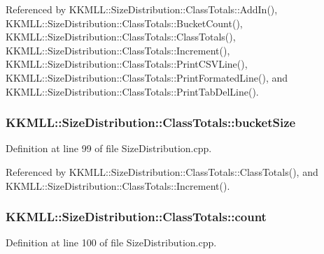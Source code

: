 Referenced by K\+K\+M\+L\+L\+::\+Size\+Distribution\+::\+Class\+Totals\+::\+Add\+In(), K\+K\+M\+L\+L\+::\+Size\+Distribution\+::\+Class\+Totals\+::\+Bucket\+Count(), K\+K\+M\+L\+L\+::\+Size\+Distribution\+::\+Class\+Totals\+::\+Class\+Totals(), K\+K\+M\+L\+L\+::\+Size\+Distribution\+::\+Class\+Totals\+::\+Increment(), K\+K\+M\+L\+L\+::\+Size\+Distribution\+::\+Class\+Totals\+::\+Print\+C\+S\+V\+Line(), K\+K\+M\+L\+L\+::\+Size\+Distribution\+::\+Class\+Totals\+::\+Print\+Formated\+Line(), and K\+K\+M\+L\+L\+::\+Size\+Distribution\+::\+Class\+Totals\+::\+Print\+Tab\+Del\+Line().

\subsubsection[{\texorpdfstring{bucket\+Size}{bucketSize}}]{ K\+K\+M\+L\+L\+::\+Size\+Distribution\+::\+Class\+Totals\+::bucket\+Size}\hypertarget{class_size_distribution_1_1_class_totals_a822890416b62bdfc6877e85569e1ab9d}{}\label{class_size_distribution_1_1_class_totals_a822890416b62bdfc6877e85569e1ab9d}


Definition at line 99 of file Size\+Distribution.\+cpp.



Referenced by K\+K\+M\+L\+L\+::\+Size\+Distribution\+::\+Class\+Totals\+::\+Class\+Totals(), and K\+K\+M\+L\+L\+::\+Size\+Distribution\+::\+Class\+Totals\+::\+Increment().

\subsubsection[{\texorpdfstring{count}{count}}]{ K\+K\+M\+L\+L\+::\+Size\+Distribution\+::\+Class\+Totals\+::count}\hypertarget{class_size_distribution_1_1_class_totals_a0b48bda46c5e908b4ab5511293837f3c}{}\label{class_size_distribution_1_1_class_totals_a0b48bda46c5e908b4ab5511293837f3c}


Definition at line 100 of file Size\+Distribution.\+cpp.



